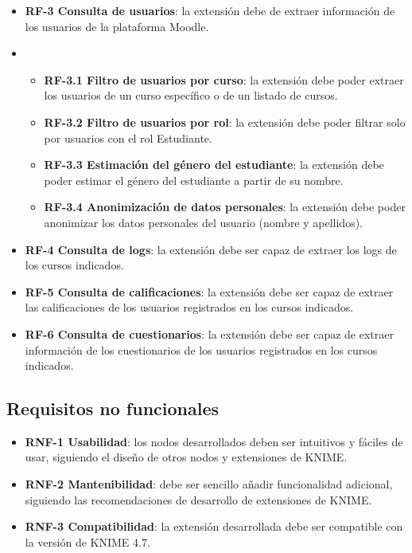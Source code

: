 \begin{itemize}
	\item \textbf{RF-3 Consulta de usuarios}: la extensión debe de extraer información de los usuarios de la plataforma Moodle.
	\item 	\begin{itemize}
		\item \textbf{RF-3.1 Filtro de usuarios por curso}: la extensión debe poder extraer los usuarios de un curso específico o de un listado de cursos. 
		\item \textbf{RF-3.2 Filtro de usuarios por rol}: la extensión debe poder filtrar solo por usuarios con el rol Estudiante. 
		\item \textbf{RF-3.3 Estimación del género del estudiante}: la extensión debe poder estimar el género del estudiante a partir de su nombre. 
		\item \textbf{RF-3.4 Anonimización de datos personales}: la extensión debe poder anonimizar los datos personales del usuario (nombre y apellidos). 
	\end{itemize}
	\item \textbf{RF-4 Consulta de logs}: la extensión debe ser capaz de extraer los logs de los cursos indicados. 
	\item \textbf{RF-5 Consulta de calificaciones}: la extensión debe ser capaz de extraer las calificaciones de los usuarios registrados en los cursos indicados. 
	\item \textbf{RF-6 Consulta de cuestionarios}: la extensión debe ser capaz de extraer información de los cuestionarios de los usuarios registrados en los cursos indicados. 
\end{itemize}

\subsection{Requisitos no funcionales}
\begin{itemize}
	\item \textbf{RNF-1 Usabilidad}: los nodos desarrollados deben ser intuitivos y fáciles de usar, siguiendo el diseño de otros nodos y extensiones de KNIME.
	\item \textbf{RNF-2 Mantenibilidad}: debe ser sencillo añadir funcionalidad adicional, siguiendo las recomendaciones de desarrollo de extensiones de KNIME.
	\item \textbf{RNF-3 Compatibilidad}: la extensión desarrollada debe ser compatible con la versión de KNIME 4.7.
\end{itemize}